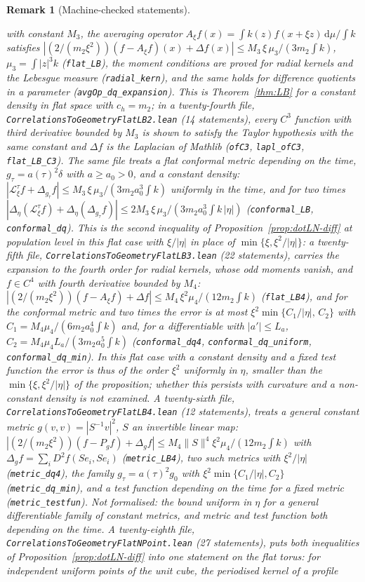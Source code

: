 \documentclass[11pt,a4paper]{article}
\theoremstyle{stmt}
\theoremstyle{defn}
\theoremstyle{rmk}
\newtheorem{remark}[theorem]{Remark}
\numberwithin{equation}{section}
\newcommand{\dd}{\mathrm{d}}
\begin{document}
{\begin{remark}[Machine-checked statements]
\begin{itemize}
with constant $M_3$, the averaging operator $A_\xi f(x)=\int k(z)f(x+\xi z)\,\dd\mu/\int k$ satisfies $|(2/(m_2\xi^2))(f-A_\xi f)(x)+\Delta f(x)|\le M_3\,\xi\,\mu_3/(3m_2\int k)$, $\mu_3=\int|z|^3k$ (\texttt{flat\_LB}), the moment conditions are proved for radial kernels and the Lebesgue measure (\texttt{radial\_kern}), and the same holds for difference quotients in a parameter (\texttt{avgOp\_dq\_expansion}). This is Theorem~\ref{thm:LB} for a constant density in flat space with $c_h=m_2$; in a twenty-fourth file, \texttt{CorrelationsToGeometryFlatLB2.lean} (14 statements), every $C^3$ function with third derivative bounded by $M_3$ is shown to satisfy the Taylor hypothesis with the same constant and $\Delta f$ is the Laplacian of Mathlib (\texttt{ofC3}, \texttt{lapl\_ofC3}, \texttt{flat\_LB\_C3}). The same file treats a flat conformal metric depending on the time, $g_\tau=a(\tau)^2\delta$ with $a\ge a_0>0$, and a constant density: $|\mathcal L^\tau_\xi f+\Delta_{g_\tau}f|\le M_3\,\xi\,\mu_3/(3m_2a_0^3\int k)$ uniformly in the time, and for two times $|\Delta_\eta(\mathcal L^\tau_\xi f)+\Delta_\eta(\Delta_{g_\tau}f)|\le2M_3\,\xi\,\mu_3/(3m_2a_0^3\int k\,|\eta|)$ (\texttt{conformal\_LB}, \texttt{conformal\_dq}). This is the second inequality of Proposition~\ref{prop:dotLN-diff} at population level in this flat case with $\xi/|\eta|$ in place of $\min\{\xi,\xi^2/|\eta|\}$: a twenty-fifth file, \texttt{CorrelationsToGeometryFlatLB3.lean} (22 statements), carries the expansion to the fourth order for radial kernels, whose odd moments vanish, and $f\in C^4$ with fourth derivative bounded by $M_4$: $|(2/(m_2\xi^2))(f-A_\xi f)+\Delta f|\le M_4\,\xi^2\mu_4/(12m_2\int k)$ (\texttt{flat\_LB4}), and for the conformal metric and two times the error is at most $\xi^2\min\{C_1/|\eta|,\,C_2\}$ with $C_1=M_4\mu_4/(6m_2a_0^4\int k)$ and, for $a$ differentiable with $|a'|\le L_a$, $C_2=M_4\mu_4L_a/(3m_2a_0^5\int k)$ (\texttt{conformal\_dq4}, \texttt{conformal\_dq\_uniform}, \texttt{conformal\_dq\_min}). In this flat case with a constant density and a fixed test function the error is thus of the order $\xi^2$ uniformly in $\eta$, smaller than the $\min\{\xi,\xi^2/|\eta|\}$ of the proposition; whether this persists with curvature and a non-constant density is not examined. A twenty-sixth file, \texttt{CorrelationsToGeometryFlatLB4.lean} (12 statements), treats a general constant metric $g(v,v)=|S^{-1}v|^2$, $S$ an invertible linear map: $|(2/(m_2\xi^2))(f-P_gf)+\Delta_gf|\le M_4\|S\|^4\xi^2\mu_4/(12m_2\int k)$ with $\Delta_gf=\sum_iD^2f(Se_i,Se_i)$ (\texttt{metric\_LB4}), two such metrics with $\xi^2/|\eta|$ (\texttt{metric\_dq4}), the family $g_\tau=a(\tau)^2g_0$ with $\xi^2\min\{C_1/|\eta|,C_2\}$ (\texttt{metric\_dq\_min}), and a test function depending on the time for a fixed metric (\texttt{metric\_testfun}). Not formalised: the bound uniform in $\eta$ for a general differentiable family of constant metrics, and metric and test function both depending on the time. A twenty-eighth file, \texttt{CorrelationsToGeometryFlatNPoint.lean} (27 statements), puts both inequalities of Proposition~\ref{prop:dotLN-diff} into one statement on the flat torus: for independent uniform points of the unit cube, the periodised kernel of a profile 
\end{itemize}
\end{remark}}
\end{document}

